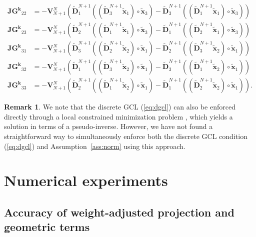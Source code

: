 \documentclass[preprint,10pt]{article}
\theoremstyle{definition}
\theoremstyle{lemma}
\newtheorem*{remark}{Remark}
\theoremstyle{theorem}
\theoremstyle{assumption}
\renewcommand{\tilde}{\widetilde}
\newcommand{\LRp}[1]{\left( #1 \right)}
\begin{document}
{\begin{align}
\bm{JG^k}_{22} &= -\bm{V}_{N+1}^N\LRp{\tilde{\bm{D}}^{N+1}_1 \LRp{ \LRp{\tilde{\bm{D}}^{N+1}_3\tilde{\bm{x}}_1} \circ\tilde{\bm{x}}_3} - \tilde{\bm{D}}^{N+1}_3 \LRp{ \LRp{\tilde{\bm{D}}^{N+1}_1\tilde{\bm{x}}_1 }\circ\tilde{\bm{x}}_3}} \nonumber\\
\bm{JG^k}_{23} &= -\bm{V}_{N+1}^N\LRp{\tilde{\bm{D}}^{N+1}_2 \LRp{ \LRp{\tilde{\bm{D}}^{N+1}_1\tilde{\bm{x}}_1} \circ\tilde{\bm{x}}_3} - \tilde{\bm{D}}^{N+1}_1 \LRp{ \LRp{\tilde{\bm{D}}^{N+1}_2\tilde{\bm{x}}_1 }\circ\tilde{\bm{x}}_3}} \nonumber\\
%
\bm{JG^k}_{31} &= -\bm{V}_{N+1}^N\LRp{\tilde{\bm{D}}^{N+1}_3 \LRp{ \LRp{\tilde{\bm{D}}^{N+1}_2 \tilde{\bm{x}}_2} \circ\tilde{\bm{x}}_1} - \tilde{\bm{D}}^{N+1}_2 \LRp{ \LRp{\tilde{\bm{D}}^{N+1}_3\tilde{\bm{x}}_2} \circ\tilde{\bm{x}}_1}} \nonumber\\
\bm{JG^k}_{32} &= -\bm{V}_{N+1}^N\LRp{\tilde{\bm{D}}^{N+1}_1 \LRp{ \LRp{\tilde{\bm{D}}^{N+1}_3\tilde{\bm{x}}_2} \circ\tilde{\bm{x}}_1} - \tilde{\bm{D}}^{N+1}_3 \LRp{  \LRp{\tilde{\bm{D}}^{N+1}_1\tilde{\bm{x}}_2 }\circ\tilde{\bm{x}}_1}} \nonumber\\
\bm{JG^k}_{33} &= -\bm{V}_{N+1}^N\LRp{\tilde{\bm{D}}^{N+1}_2 \LRp{ \LRp{\tilde{\bm{D}}^{N+1}_1\tilde{\bm{x}}_2} \circ\tilde{\bm{x}}_1} - \tilde{\bm{D}}^{N+1}_1 \LRp{  \LRp{\tilde{\bm{D}}^{N+1}_2\tilde{\bm{x}}_2 }\circ\tilde{\bm{x}}_1}}. \nonumber
\end{align}
\begin{remark}

We note that the discrete GCL (\ref{eq:dgcl}) can also be enforced directly through a local constrained minimization problem \cite{fernandez2016simultaneous, crean2018entropy}, which yields a solution in terms of a pseudo-inverse.  However, we have not found a straightforward way to simultaneously enforce both the discrete GCL condition (\ref{eq:dgcl}) and Assumption~\ref{ass:norm} using this approach.
\end{remark}


\section{Numerical experiments}
\label{sec:num}

\subsection{Accuracy of weight-adjusted projection and geometric terms}

}
\end{document}
